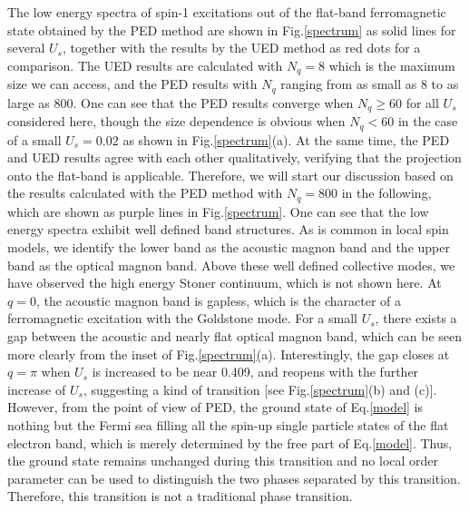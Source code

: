 \documentclass[amsmath,superscriptaddress,showpacs,aps,prb,twocolumn]{revtex4-1}
\begin{document}
\par The low energy spectra of spin-1 excitations out of the flat-band ferromagnetic state obtained by the PED method are shown in Fig.\ref{spectrum} as solid lines for several $U_{s}$, together with the results by the UED method as red dots for a comparison. The UED results are calculated with $N_q=8$ which is the maximum size we can access, and the PED results with $N_q$ ranging from as small as $8$ to as large as $800$. One can see that the PED results converge when $N_q\ge 60$ for all $U_s$ considered here, though the size dependence is obvious when $N_q< 60$ in the case of a small $U_s=0.02$ as shown in Fig.\ref{spectrum}(a). At the same time, the PED and UED results agree with each other qualitatively, verifying that the projection onto the flat-band is applicable. Therefore, we will start our discussion based on the results calculated with the PED method with $N_q=800$ in the following, which are shown as purple lines in Fig.\ref{spectrum}. One can see that the low energy spectra exhibit well defined band structures. As is common in local spin models, we identify the lower band as the acoustic magnon band and the upper band as the optical magnon band. Above these well defined collective modes, we have observed the high energy Stoner continuum, which is not shown here\cite{KA_PRL1994}. At $q=0$, the acoustic magnon band is gapless, which is the character of a ferromagnetic excitation with the Goldstone mode. For a small $U_s$, there exists a gap between the acoustic and nearly flat optical magnon band, which can be seen more clearly from the inset of Fig.\ref{spectrum}(a). Interestingly, the gap closes at $q=\pi$ when $U_s$ is increased to be near 0.409, and reopens with the further increase of $U_s$, suggesting a kind of transition [see Fig.\ref{spectrum}(b) and (c)]. However, from the point of view of PED, the ground state of Eq.\ref{model} is nothing but the Fermi sea filling all the spin-up single particle states of the flat electron band, which is merely determined by the free part of Eq.\ref{model}. Thus, the ground state remains unchanged during this transition and no local order parameter can be used to distinguish the two phases separated by this transition. Therefore, this transition is not a traditional phase transition.
\end{document}
